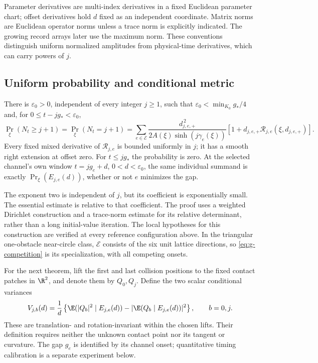 Parameter derivatives are multi-index derivatives in a fixed Euclidean
parameter chart; offset derivatives hold $d$ fixed as an independent
coordinate. Matrix norms are Euclidean operator norms unless a trace
norm is explicitly indicated. The growing record arrays later use the
maximum norm. These conventions distinguish uniform normalized
amplitudes from physical-time derivatives, which can carry powers of $j$.

\subsection{Uniform probability and conditional metric}
\begin{theorem}
\label{thm:g-stability}
There is $\varepsilon_0>0$, independent of every integer $j\ge1$, such
that $\varepsilon_0<\min_{K_0}g_*/4$ and, for
$0\le t-jg_*<\varepsilon_0$,
\begin{equation}\label{eq:g-competition}
 \Pr_\xi(N_t\ge j+1)=\Pr_\xi(N_t=j+1)
 =\sum_{e\in\mathcal E}
 \frac{d_{j,e,+}^{\,2}}{2A(\xi)\sinh(j\gamma_e(\xi))}
       [1+d_{j,e,+}\mathcal R_{j,e}(\xi,d_{j,e,+})].
\end{equation}
Every fixed mixed derivative of $\mathcal R_{j,e}$ is bounded uniformly
in $j$; it has a smooth right extension at offset zero. For $t\le jg_*$
the probability is zero. At the selected channel's own window
$t=jg_e+d$, $0<d<\varepsilon_0$, the same individual summand is exactly
$\Pr_\xi(E_{j,e}(d))$, whether or not $e$ minimizes the gap.
\end{theorem}

The exponent two is independent of $j$, but its coefficient is
exponentially small. The essential estimate is relative to that
coefficient. The proof uses a weighted Dirichlet construction and a
trace-norm estimate for its relative determinant, rather than a
long initial-value iteration. The local hypotheses for this construction
are verified at every reference configuration above. In the triangular
one-obstacle near-circle class, $\mathcal E$ consists of the six unit
lattice directions, so \eqref{eq:g-competition} is its specialization, with all competing onsets.

For the next theorem, lift the first and last collision positions to
the fixed contact patches in $\R^2$, and denote them by $Q_0,Q_j$.
Define the two scalar conditional variances
\begin{equation}\label{eq:v3-observed-variance}
 V_{j,b}(d)=\frac1d\left\{
 \E(|Q_b|^2\mid E_{j,e}(d))-
       |\E(Q_b\mid E_{j,e}(d))|^2\right\},\qquad b=0,j.
\end{equation}
These are translation- and rotation-invariant within the chosen lifts.
Their definition requires neither the unknown contact point nor its
tangent or curvature. The gap $g_e$ is identified by its channel onset; quantitative timing
calibration is a separate experiment below.

